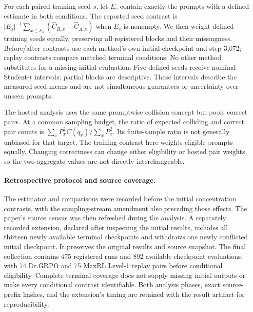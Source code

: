 For each paired training seed $s$, let $E_s$ contain exactly the prompts with
a defined estimate in both conditions. The reported seed contrast is
$|E_s|^{-1}\sum_{x\in E_s}(\widehat C_{B,x}-\widehat C_{A,x})$ when
$E_s$ is nonempty. We then weight defined training seeds equally, preserving
all registered blocks and their missingness. Before/after contrasts use each
method's own initial checkpoint and step 3,072; replay contrasts compare
matched terminal conditions. No other method substitutes for a missing
initial evaluation. Five defined seeds receive nominal Student-$t$ intervals;
partial blocks are descriptive. These intervals describe the measured seed
means and are not simultaneous guarantees or uncertainty over unseen prompts.

The hosted analysis uses the same promptwise collision concept but pools
correct pairs. At a common sampling budget, the ratio of expected colliding
and correct pair counts is
$\sum_x P_x^2 C(q_x)/\sum_x P_x^2$. Its finite-sample ratio is not generally
unbiased for that target. The training contrast here weights eligible prompts
equally. Changing correctness can change either eligibility or hosted pair
weights, so the two aggregate values are not directly interchangeable.

\paragraph{Retrospective protocol and source coverage.}
The estimator and comparisons were recorded before the initial concentration
contrasts, with the sampling-stream amendment also preceding those effects.
The paper's source census was then refreshed during the analysis. A separately
recorded extension, declared after inspecting the initial results, includes
all thirteen newly available terminal checkpoints and withdraws one newly
conflicted initial checkpoint. It preserves the original results and source
snapshot. The final collection contains 475 registered runs and 892 available
checkpoint evaluations, with 74 Dr.GRPO and 75 MaxRL Level-1 replay pairs
before conditional eligibility. Complete terminal coverage does not supply
missing initial outputs or make every conditional contrast identifiable.
Both analysis phases, exact source-prefix hashes, and the extension's timing
are retained with the result artifact for reproducibility.


